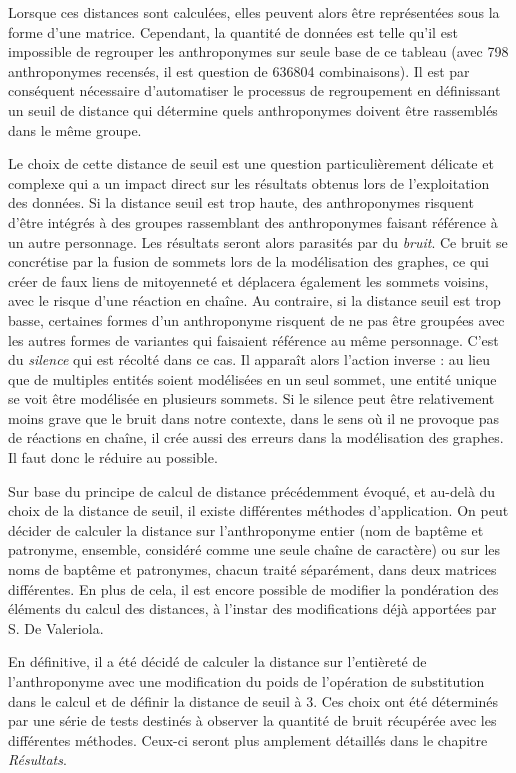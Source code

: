 Lorsque ces distances sont calculées, elles peuvent alors être représentées sous la forme d'une matrice. Cependant, la quantité de données  est telle qu'il est impossible de regrouper les anthroponymes sur seule base de ce tableau (avec 798 anthroponymes recensés, il est question de 636804 combinaisons). Il est par conséquent nécessaire d'automatiser le processus de regroupement en définissant  un seuil de distance qui détermine quels  anthroponymes doivent être rassemblés dans le même groupe. 

Le choix de cette distance de seuil est une question particulièrement délicate et complexe qui a un impact  direct sur les résultats obtenus lors de l'exploitation des données. Si la distance seuil est trop haute, des anthroponymes risquent d'être intégrés à des groupes rassemblant des anthroponymes faisant référence à un autre personnage. Les résultats seront alors parasités par du \textit{bruit}. Ce bruit se concrétise par la fusion de sommets lors de la modélisation des graphes, ce qui créer de faux liens de mitoyenneté et déplacera également les sommets voisins, avec le risque d'une réaction en chaîne.
Au contraire, si la distance seuil est trop basse, certaines formes d'un anthroponyme risquent de ne pas être groupées avec les autres formes de variantes qui faisaient référence au même personnage. C'est du \textit{silence} qui est récolté dans ce cas. Il apparaît alors l'action inverse : au lieu que de multiples entités soient modélisées en un seul sommet, une entité unique se voit être modélisée en plusieurs sommets. Si le silence peut être relativement moins grave que le bruit dans notre contexte, dans le sens où il ne provoque pas de réactions en chaîne, il crée aussi des erreurs dans la modélisation des graphes. Il faut donc le réduire au possible.

Sur base du principe de calcul de distance précédemment évoqué, et au-delà du choix de la distance de seuil, il existe différentes méthodes d'application. On peut décider de calculer la distance sur l'anthroponyme entier (nom de baptême et patronyme, ensemble, considéré comme une seule chaîne de caractère) ou sur les noms de baptême  et patronymes, chacun traité séparément, dans deux matrices différentes. En plus de cela, il est encore possible de modifier la pondération des éléments du  calcul des distances, à l'instar des modifications déjà apportées par S. De Valeriola.

En définitive, il a été décidé de calculer la distance sur l'entièreté de l'anthroponyme avec  une modification du poids de l'opération de substitution dans le calcul et de définir la distance de seuil à 3. 
Ces choix ont été déterminés par une série de tests destinés à observer la quantité de bruit récupérée avec les différentes méthodes. Ceux-ci seront plus amplement détaillés dans le chapitre \textit{Résultats}.






